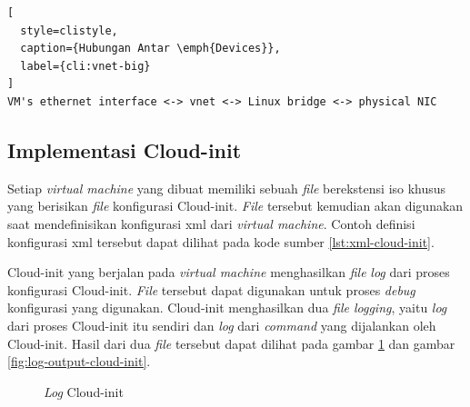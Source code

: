 \begin{lstlisting}[
  style=clistyle,
  caption={Hubungan Antar \emph{Devices}},
  label={cli:vnet-big}
]
VM's ethernet interface <-> vnet <-> Linux bridge <-> physical NIC
\end{lstlisting}

\subsection{Implementasi Cloud-init}
\label{subsec:implementasi-cloud-init}

Setiap \emph{virtual machine} yang dibuat memiliki sebuah \emph{file} berekstensi iso khusus
yang berisikan \emph{file} konfigurasi Cloud-init. \emph{File} tersebut kemudian akan digunakan
saat mendefinisikan konfigurasi xml dari \emph{virtual machine}. Contoh definisi konfigurasi
xml tersebut dapat dilihat pada kode sumber \ref{lst:xml-cloud-init}.



Cloud-init yang berjalan pada \emph{virtual machine} menghasilkan \emph{file}
\emph{log} dari proses konfigurasi Cloud-init. \emph{File} tersebut dapat digunakan
untuk proses \emph{debug} konfigurasi yang digunakan. Cloud-init menghasilkan
dua \emph{file logging}, yaitu \emph{log} dari proses Cloud-init itu sendiri
dan \emph{log} dari \emph{command} yang dijalankan oleh Cloud-init. Hasil
dari dua \emph{file} tersebut dapat dilihat pada gambar \ref{fig:log-cloud-init}
dan gambar \ref{fig:log-output-cloud-init}.

\begin{figure}[H]
  \centering
  \caption{\emph{Log} Cloud-init}
  \label{fig:log-cloud-init}
\end{figure}

